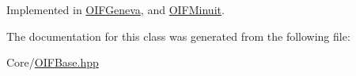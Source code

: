 Implemented in \hyperlink{classOIFGeneva_a1a5cf2ace477bd40ce1c4848365a2f13}{OIFGeneva}, and \hyperlink{classOIFMinuit_a6a8ff974bdddf918ab2abb5a5a7810b6}{OIFMinuit}.



The documentation for this class was generated from the following file:\begin{DoxyCompactItemize}
\item 
Core/\hyperlink{OIFBase_8hpp}{OIFBase.hpp}\end{DoxyCompactItemize}
